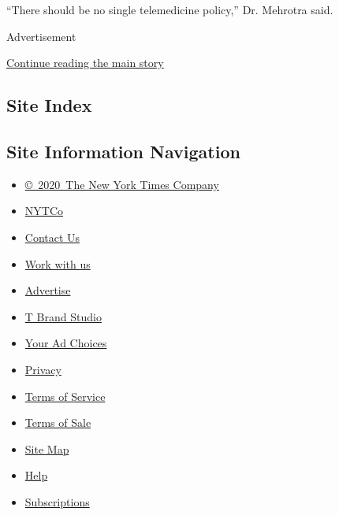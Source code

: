 ``There should be no single telemedicine policy,'' Dr. Mehrotra said.

Advertisement

\protect\hyperlink{after-bottom}{Continue reading the main story}

\hypertarget{site-index}{%
\subsection{Site Index}\label{site-index}}

\hypertarget{site-information-navigation}{%
\subsection{Site Information
Navigation}\label{site-information-navigation}}

\begin{itemize}
\tightlist
\item
  \href{https://help.nytimes.com/hc/en-us/articles/115014792127-Copyright-notice}{©~2020~The
  New York Times Company}
\end{itemize}

\begin{itemize}
\tightlist
\item
  \href{https://www.nytco.com/}{NYTCo}
\item
  \href{https://help.nytimes.com/hc/en-us/articles/115015385887-Contact-Us}{Contact
  Us}
\item
  \href{https://www.nytco.com/careers/}{Work with us}
\item
  \href{https://nytmediakit.com/}{Advertise}
\item
  \href{http://www.tbrandstudio.com/}{T Brand Studio}
\item
  \href{https://www.nytimes.com/privacy/cookie-policy\#how-do-i-manage-trackers}{Your
  Ad Choices}
\item
  \href{https://www.nytimes.com/privacy}{Privacy}
\item
  \href{https://help.nytimes.com/hc/en-us/articles/115014893428-Terms-of-service}{Terms
  of Service}
\item
  \href{https://help.nytimes.com/hc/en-us/articles/115014893968-Terms-of-sale}{Terms
  of Sale}
\item
  \href{https://spiderbites.nytimes.com}{Site Map}
\item
  \href{https://help.nytimes.com/hc/en-us}{Help}
\item
  \href{https://www.nytimes.com/subscription?campaignId=37WXW}{Subscriptions}
\end{itemize}
